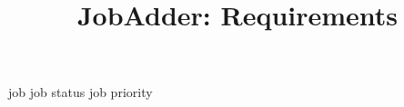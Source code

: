 \documentclass[a4paper,10pt]{article}
\title{JobAdder: Requirements}
\author{}
\begin{document}
\maketitle







\gls{job}
\gls{job status}
\gls{job priority}
\printnoidxglossaries
\end{document}
